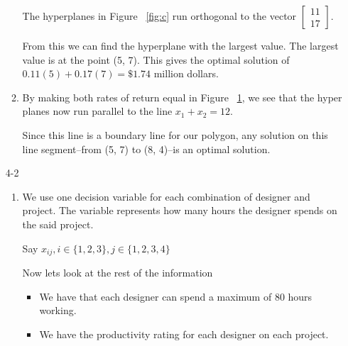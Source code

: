 \documentclass[12pt,letterpaper]{article}
\begin{document}
\begin{enumerate}
\begin{enumerate}
\begin{figure}
\begin{minipage}{.5\textwidth}

              \label{fig:d}
            \end{minipage}
          \end{figure}

          The hyperplanes in Figure ~\ref{fig:c} run orthogonal to the vector
          $\begin{bmatrix}11 \\ 17\end{bmatrix}$.

          From this we can find the hyperplane with the largest value.
          The largest value is at the point (5, 7).
          This gives the optimal solution of
          $0.11(5) + 0.17(7) = \$1.74$ million dollars.

        \item
          By making both rates of return equal in Figure ~\ref{fig:d},
          we see that the hyper planes now run parallel to the line $x_1 + x_2 = 12$.

          Since this line is a boundary line for our polygon,
          any solution on this line segment--from (5, 7) to (8, 4)--is an optimal solution.
      \end{enumerate}

    \item [4-2]
      \begin{enumerate}
        \item
          We use one decision variable for each combination of designer and project.
          The variable represents how many hours the designer spends on the said project.

          Say $x_{ij}, i \in \{1, 2, 3\}, j \in \{1, 2, 3, 4\}$

          Now lets look at the rest of the information

          \begin{itemize}
            \item We have that each designer can spend a maximum of 80 hours working.
            \item
              We have the productivity rating for each designer on each project.


\end{itemize}
\end{enumerate}
\end{enumerate}
\end{document}
